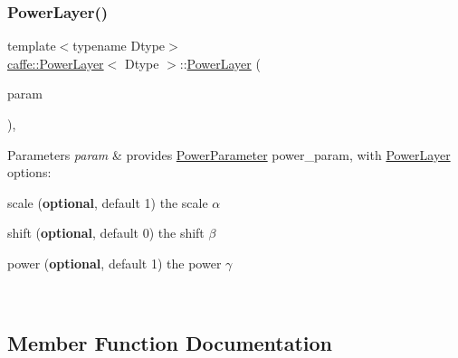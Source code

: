 \subsubsection{\texorpdfstring{Power\+Layer()}{PowerLayer()}\hspace{0.1cm}{\footnotesize\ttfamily [2/2]}}
{\footnotesize\ttfamily template$<$typename Dtype$>$ \\
\mbox{\hyperlink{classcaffe_1_1_power_layer}{caffe\+::\+Power\+Layer}}$<$ Dtype $>$\+::\mbox{\hyperlink{classcaffe_1_1_power_layer}{Power\+Layer}} (\begin{DoxyParamCaption}\item[{const \mbox{\hyperlink{classcaffe_1_1_layer_parameter}{Layer\+Parameter}} \&}]{param }\end{DoxyParamCaption})\hspace{0.3cm}{\ttfamily [inline]}, {\ttfamily [explicit]}}


\begin{DoxyParams}{Parameters}
{\em param} & provides \mbox{\hyperlink{classcaffe_1_1_power_parameter}{Power\+Parameter}} power\+\_\+param, with \mbox{\hyperlink{classcaffe_1_1_power_layer}{Power\+Layer}} options\+:
\begin{DoxyItemize}
\item scale ({\bfseries optional}, default 1) the scale $ \alpha $
\item shift ({\bfseries optional}, default 0) the shift $ \beta $
\item power ({\bfseries optional}, default 1) the power $ \gamma $ 
\end{DoxyItemize}\\
\hline
\end{DoxyParams}


\subsection{Member Function Documentation}
\mbox{\label{classcaffe_1_1_power_layer_a98e5481671ca13339f888cad61b3d515}} 
